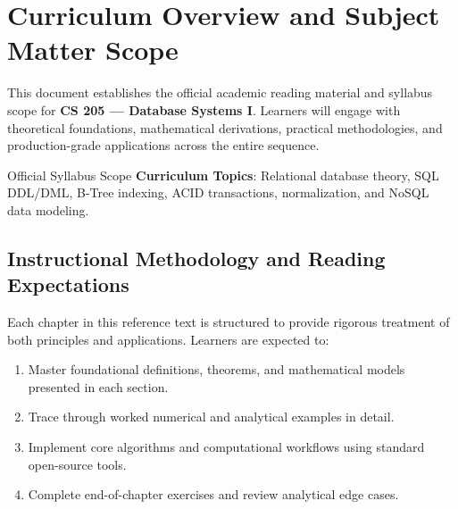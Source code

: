 \section{Curriculum Overview and Subject Matter Scope}

This document establishes the official academic reading material and syllabus scope for \textbf{CS 205 --- Database Systems I}. Learners will engage with theoretical foundations, mathematical derivations, practical methodologies, and production-grade applications across the entire sequence.

\begin{InsightBox}{Official Syllabus Scope}
  \textbf{Curriculum Topics}: Relational database theory, SQL DDL/DML, B-Tree indexing, ACID transactions, normalization, and NoSQL data modeling.
\end{InsightBox}

\subsection{Instructional Methodology and Reading Expectations}

Each chapter in this reference text is structured to provide rigorous treatment of both principles and applications. Learners are expected to:
\begin{enumerate}
  \item Master foundational definitions, theorems, and mathematical models presented in each section.
  \item Trace through worked numerical and analytical examples in detail.
  \item Implement core algorithms and computational workflows using standard open-source tools.
  \item Complete end-of-chapter exercises and review analytical edge cases.
\end{enumerate}


